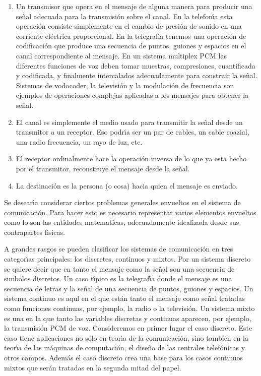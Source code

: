 \begin{enumerate}
\item{Un transmisor que opera en el mensaje de alguna manera para
  producir una se\~{n}al adecuada para la transmisi\'{o}n sobre el
  canal. En la telefon\'{\i}a esta operaci\'{o}n consiste simplemente en
  el cambio de presi\'{o}n de sonido en una corriente el\'{e}ctrica
  proporcional. En la telegraf\'{\i}a tenemos una operaci\'{o}n de
  codificaci\'{o}n que produce una secuencia de puntos, guiones y
  espacios en el canal correspondiente al mensaje. En un sistema
  multiplex PCM las diferentes funciones de voz deben tomar muestras,
  compresiones, cuantificada y codificada, y finalmente intercalados
  adecuadamente para construir la se\~{n}al. Sistemas de vodocoder, la
  televisi\'{o}n y la modulaci\'{o}n de frecuencia son ejemplos de
  operaciones complejas aplicadas a los mensajes para obtener la
  se\~{n}al.}
\item{El canal es simplemente el medio usado para transmitir la se\~{n}al
  desde un transmitor a un receptor. Eso podr\'{\i}a ser un par de
  cables, un cable coazial, una radio frecuencia, un rayo de luz, etc.}
\item{El receptor ordinalmente hace la operaci\'{o}n inversa de lo que ya
  esta hecho por el transmitor, reconstruye el mensaje desde la se\~{n}al.}
\item{La destinaci\'{o}n es la persona (o cosa) hacia quien el mensaje es
  enviado.}
\end{enumerate}

Se desear\'{\i}a considerar ciertos problemas generales envueltos en
el sistema de comunicaci\'{o}n. Para hacer esto es necesario
representar varios elementos envueltos como lo son las entidades
matematicas, adecuadamente idealizada desde sus contrapartes
f\'{\i}sicas.


A grandes rasgos se pueden clasificar los sistemas de comunicaci\'{o}n
en tres categor\'{\i}as principales: los discretes, continuos y
mixtos. Por un sistema discreto se quiere decir que en tanto el
mensaje como la se\~{n}al son una secuencia de simbolos discretos. Un
caso t\'{\i}pico es la telegraf\'{\i}a donde el mensaje es una
secuencia de letras y la se\~{n}al de una secuencia de puntos, guiones
y espacios. Un sistema continuo es aqul en el que est\'{a}n tanto el
mensaje como se\~{n}al tratadas como funciones continuas, por ejemplo,
la radio o la televisi\'{o}n. Un sistema mixto es una en la que tanto
las variables discretas y continuas aparecen, por ejemplo, la
transmisi\'{o}n PCM de voz. Consideremos en primer lugar el caso
discreto. Este caso tiene aplicaciones no s\'{o}lo en teor\'{\i}a de
la comunicaci\'{o}n, sino tambi\'{e}n en la teor\'{\i}a de las
m\'{a}quinas de computaci\'{o}n, el dise\~{n}o de las centrales
telef\'{o}nicas y otros campos.  Adem\'{a}s el caso discreto crea una
base para los casos continuos mixtos que ser\'{a}n tratadas en la
segunda mitad del papel.

